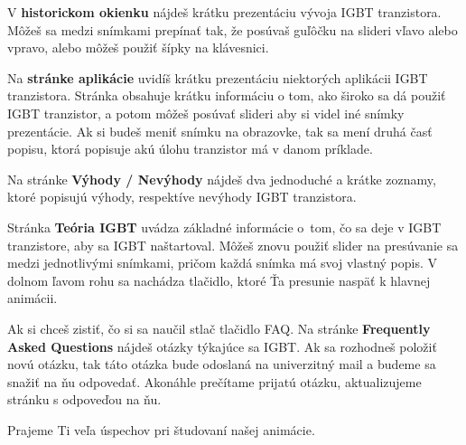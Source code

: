 V \textbf{historickom okienku} nájdeš krátku prezentáciu vývoja IGBT tranzistora. Môžeš sa medzi snímkami prepínať tak, že posúvaš guľôčku na slideri vľavo alebo vpravo, alebo môžeš použiť šípky na klávesnici.

Na \textbf{stránke aplikácie} uvidíš krátku prezentáciu niektorých aplikácii IGBT tranzistora. Stránka obsahuje krátku informáciu o tom, ako široko sa dá použiť IGBT tranzistor, a potom môžeš posúvať slideri aby si videl iné snímky prezentácie. Ak si budeš meniť snímku na obrazovke, tak sa mení druhá časť popisu, ktorá popisuje akú úlohu tranzistor má v danom príklade.

Na stránke \textbf{Výhody / Nevýhody} nájdeš dva jednoduché a krátke zoznamy, ktoré popisujú výhody, respektíve nevýhody IGBT tranzistora.

Stránka \textbf{Teória IGBT} uvádza základné informácie  o tom, čo sa deje v IGBT tranzistore, aby sa IGBT naštartoval. Môžeš znovu použiť slider na presúvanie sa medzi jednotlivými snímkami, pričom každá snímka má svoj vlastný popis. V dolnom ľavom rohu sa nachádza tlačidlo, ktoré Ťa presunie naspäť k hlavnej animácii.

Ak si chceš zistiť, čo si sa naučil stlač tlačidlo FAQ. Na stránke \textbf{Frequently Asked Questions} nájdeš otázky týkajúce sa IGBT. Ak sa rozhodneš položiť novú otázku, tak táto otázka bude odoslaná na univerzitný mail a budeme sa snažiť na ňu odpovedať. Akonáhle prečítame prijatú otázku, aktualizujeme stránku s odpoveďou na ňu.

Prajeme Ti veľa úspechov pri študovaní našej animácie.